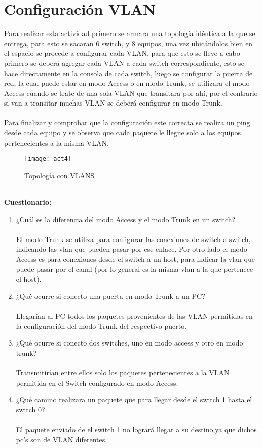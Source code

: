 \documentclass{udpreport}
\begin{document}
	\section{Configuración VLAN}
	    Para realizar esta actividad primero se armara una topología idéntica a la que se entrega, para esto se sacaran 6 switch, y 8 equipos, una vez ubicándolos bien en el espacio se procede a configurar cada VLAN, para que esto se lleve a cabo primero se deberá agregar cada VLAN a cada switch correspondiente, esto se hace directamente en la consola de cada switch, luego se configurar la puerta de red, la cual puede estar en modo Access o en modo Trunk, se utilizara el modo Access cuando se trate de una sola VLAN que transitara por ahí, por el contrario si van a transitar muchas VLAN se deberá configurar en modo Trunk.\\\\
    Para finalizar y comprobar que la configuración este correcta se realiza un ping desde cada equipo y se observa que cada
	paquete le llegue solo a los equipos pertenecientes a la misma VLAN.\\
	
	\begin{figure}[H]
	\centering
	\texttt{[image: act4]}
	\caption{Topología con VLANS}
	\end{figure}\\	
	
	
	{\large \bf{Cuestionario: }}\\
	\begin{enumerate}
	    \item ¿Cuál es la diferencia del modo Access y el modo Trunk en un switch?\\\\
	         El modo Trunk se utiliza para configurar las conexiones de switch a switch, indicando las vlan que pueden pasar por ese enlace. Por otro lado el modo Access es para conexiones desde el switch a un host, para indicar la vlan que puede pasar por el canal (por lo general es la misma vlan a la que pertenece el host).
        \item  ¿Qué ocurre si conecto una puerta en modo Trunk a un PC?\\\\
            Llegarían al PC todos los paquetes provenientes de las VLAN permitidas en la configuración del modo Trunk del respectivo puerto.
        \item ¿Qué ocurre si conecto dos switches, uno en modo access y otro en modo trunk?\\\\
              Transmitirían entre ellos solo los paquetes pertenecientes a la VLAN 
  	      permitida en el Switch configurado en modo Access.
  	     \item  ¿Qué camino realizara un paquete que para llegar desde el switch 1 hasta el switch 0?\\\\
  	        El paquete enviado de el switch 1 no logrará llegar a su destino,ya que dichos pc's son de VLAN diferentes.
  	     
	\end{enumerate}
\end{document}
